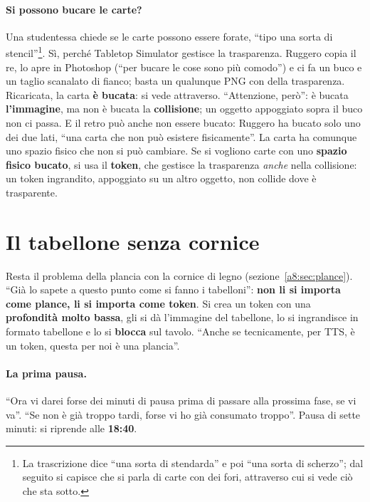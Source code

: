 \paragraph{Si possono bucare le carte?} Una studentessa chiede se le carte possono essere
forate, ``tipo una sorta di stencil''\footnote{La trascrizione dice ``una sorta di
stendarda'' e poi ``una sorta di scherzo''; dal seguito si capisce che si parla di
carte con dei fori, attraverso cui si vede ciò che sta sotto.}. Sì, perché Tabletop
Simulator gestisce la trasparenza. Ruggero copia il re, lo apre in Photoshop (``per
bucare le cose sono più comodo'') e ci fa un buco e un taglio scanalato di fianco;
basta un qualunque PNG con della trasparenza. Ricaricata, la carta \textbf{è bucata}:
si vede attraverso. ``Attenzione, però'': è bucata \textbf{l'immagine}, ma non è
bucata la \textbf{collisione}; un oggetto appoggiato sopra il buco non ci passa. E
il retro può anche non essere bucato: Ruggero ha bucato solo uno dei due lati, ``una
carta che non può esistere fisicamente''. La carta ha comunque uno spazio fisico che
non si può cambiare. Se si vogliono carte con uno \textbf{spazio fisico bucato}, si
usa il \textbf{token}, che gestisce la trasparenza \emph{anche} nella collisione: un
token ingrandito, appoggiato su un altro oggetto, non collide dove è trasparente.

\section{Il tabellone senza cornice}
\label{a8:sec:tabellone}

Resta il problema della plancia con la cornice di legno
(sezione~\ref{a8:sec:plance}). ``Già lo sapete a questo punto come si fanno i
tabelloni'': \textbf{non li si importa come plance, li si importa come token}. Si crea
un token con una \textbf{profondità molto bassa}, gli si dà l'immagine del tabellone,
lo si ingrandisce in formato tabellone e lo si \textbf{blocca} sul tavolo. ``Anche se
tecnicamente, per TTS, è un token, questa per noi è una plancia''.

\paragraph{La prima pausa.} ``Ora vi darei forse dei minuti di pausa prima di passare
alla prossima fase, se vi va''. ``Se non è già troppo tardi, forse vi ho già consumato
troppo''. Pausa di sette minuti: si riprende alle \textbf{18:40}.

